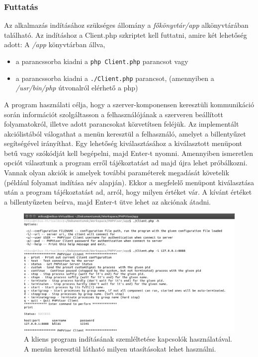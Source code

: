 \documentclass[12pt]{report}
\begin{document}
  \subsubsection{Futtatás}
  Az alkalmazás indításához szükséges állomány a \textit{főkönyvtár/app} alkönyvtárában található. Az indításhoz a  Client.php szkriptet kell futtatni, amire két lehetőség adott: A \textit{/app} könyvtárban állva,
  \begin{itemize}
  \item a parancssorba kiadni a \verb|php Client.php| parancsot vagy
  \item a parancssorba kiadni a \verb|./Client.php| parancsot, (amennyiben a \textit{/usr/bin/php} útvonalról elérhető a php)
  \end{itemize}
  A program használati célja, hogy a szerver-komponensen keresztüli kommunikáció során információt szolgáltasson a felhasználójának a szerveren beállított folyamatokról, illetve adott parancsokat közvetítsen feléjük. Az implementált akciólistából válogathat a menün keresztül a felhasználó, amelyet a billentyűzet segítségével irányíthat. Egy lehetőség kiválasztásához a kiválasztott menüpont betű vagy szókódját kell begépelni, majd Enter-t nyomni. Amennyiben ismeretlen opciót választunk a program erről tájékoztatást ad majd újra lehet próbálkozni. Vannak olyan akciók is amelyek további paraméterek megadását követelik (például folyamat indítása név alapján). Ekkor a megfelelő menüpont kiválasztása után a program tájékoztatást ad, arról, hogy milyen értéket vár. A kívánt értéket a billentyűzeten beírva, majd Enter-t ütve lehet az akciónak átadni.
  
    \begin{figure}[ht]
  \centering
  \includegraphics[width=14cm]{pics/cli_h_conf.png}
	  \caption{A kliens program indításának szemléltetése  kapcsolók használatával. A menün keresztül látható milyen utasításokat lehet használni. \newline}
      \label{fig:cliconf}
  \end{figure}
  
\end{document}
